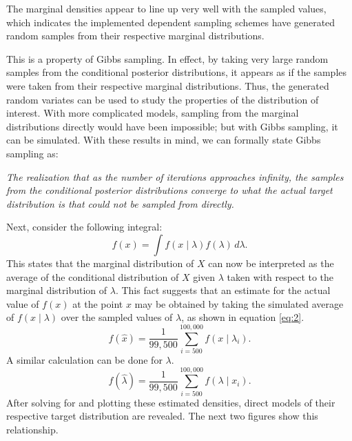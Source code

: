 \documentclass[11pt, oneside]{article}
\begin{document}
\begin{figure}[h]
\begin{minipage}{0.45\textwidth}
     \end{minipage}
\end{figure}

The marginal densities appear to line up very well with the sampled values, which indicates the implemented dependent sampling schemes have generated random samples from their respective marginal distributions. 

This is a property of Gibbs sampling. In effect, by taking very large random samples from the conditional posterior distributions, it appears as if the samples were taken from their respective marginal distributions. Thus, the generated random variates can be used to study the properties of the distribution of interest. With more complicated models, sampling from the marginal distributions directly would have been impossible; but with Gibbs sampling, it can be simulated. With these results in mind, we can formally state Gibbs sampling as:

\textit{The realization that as the number of iterations approaches infinity, the samples from the conditional posterior distributions converge to what the actual target distribution is that could not be sampled from directly.}

Next, consider the following integral:
\[
f(x) = \int f(x\mid\lambda)f(\lambda)\,d\lambda.
\]
This states that the marginal distribution of $X$ can now be interpreted as the average of the conditional distribution of $X$ given $\lambda$ taken with respect to the marginal distribution of $\lambda$. This fact suggests that an estimate for the actual value of $f(x)$ at the point $x$ may be obtained by taking the simulated average of $f(x\mid\lambda)$ over the sampled values of $\lambda$, as shown in equation \ref{eq:2}. 
\begin{equation}\label{eq:2}
f(\hat{x}) = \frac{1}{99,500}\sum_{i=500}^{100,000}f(x\mid\lambda_i).
\end{equation}
A similar calculation can be done for $\lambda$.
\[
f(\hat{\lambda}) = \frac{1}{99,500}\sum_{i=500}^{100,000}f(\lambda\mid x_i).
\]
After solving for and plotting these estimated densities, direct models of their respective target distribution are revealed. The next two figures show this relationship.
\end{document}
